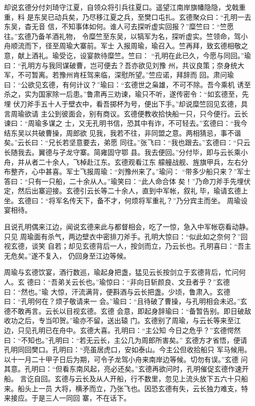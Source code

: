 却说玄德分付刘琦守江夏，自领众将引兵往夏口。遥望江南岸旗幡隐隐，戈戟重重，料
是东吴已动兵矣，乃尽移江夏之兵，至樊口屯扎。玄德聚众曰：“孔明一去东吴，杳无音
信，不知事体如何。谁人可去探听虚实回报？”糜竺曰：“竺愿往。”玄德乃备羊酒礼物，
令糜竺至东吴，以犒军为名，探听虚实。竺领命，驾小舟顺流而下，径至周瑜大寨前。军士
入报周瑜，瑜召入。竺再拜，致玄德相敬之意，献上酒礼。瑜受讫，设宴款待糜竺。竺曰：
“孔明在此已久，今愿与同回。”瑜曰：“孔明方与我同谋破曹，岂可便去？吾亦欲见刘豫
州，共议良策；奈身统大军，不可暂离。若豫州肯枉驾来临，深慰所望。”竺应诺，拜辞而
回。肃问瑜曰：“公欲见玄德，有何计议？”瑜曰：“玄德世之枭雄，不可不除。吾今乘机
诱至杀之，实为国家除一后患。”鲁肃再三劝谏，瑜只不听，遂传密令：“如玄德至，先埋
伏刀斧手五十人于壁衣中，看吾掷杯为号，便出下手。”却说糜竺回见玄德，具言周瑜欲请
主公到彼面会，别有商议。玄德便教收拾快船一只，只今便行。云长谏曰：“周瑜多谋之
士，又无孔明书信，恐其中有诈，不可轻去。”玄德曰：“我今结东吴以共破曹操，周郎欲
见我，我若不往，非同盟之意。两相猜忌，事不谐矣。”云长曰：“兄长若坚意要去，弟愿
同往。”张飞曰：“我也跟去。”玄德曰：“只云长随我去。翼德与子龙守寨。简雍固守鄂
县。我去便回。”分付毕，即与云长乘小舟，并从者二十余人，飞棹赴江东。玄德观看江东
艨艟战舰、旌旗甲兵，左右分布整齐，心中甚喜。军士飞报周瑜：“刘豫州来了。”瑜问：
“带多少船只来？”军士答曰：“只有一只船，二十余从人。”瑜笑曰：“此人命合体
矣！”乃命刀斧手先埋伏定，然后出寨迎接。玄德引云长等二十余人，直到中军帐，叙礼
毕，瑜请玄德上坐。玄德曰：“将军名传天下，备不才，何烦将军重礼？”乃分宾主而坐。
周瑜设宴相待。

且说孔明偶来江边，闻说玄德来此与都督相会，吃了一惊，急入中军帐窃看动静。只见
周瑜面有杀气，两边壁衣中密排刀斧手。孔明大惊曰：“似此如之奈何？”回视玄德，谈笑
自若；却见玄德背后一人，按剑而立，乃云长也。孔明喜曰：“吾主无危矣。”遂不复入，
仍回身至江边等候。

周瑜与玄德饮宴，酒行数巡，瑜起身把盏，猛见云长按剑立于玄德背后，忙问何人。玄
德曰：“吾弟关云长也。”瑜惊曰：“非向日斩颜良、文丑者乎？”玄德曰：“然也。”瑜
大惊，汗流满背，便斟酒与云长把盏。少顷，鲁肃入。玄德曰：“孔明何在？烦子敬请来一
会。”瑜曰：“且待破了曹操，与孔明相会未迟。”玄德不敢再言。云长以目视玄德。玄德
会意，即起身辞瑜曰：“备暂告别。即日破敌收功之后，专当叩贺。”瑜亦不留，送出辕
门。玄德别了周瑜，与云长等来至江边，只见孔明已在舟中。玄德大喜。孔明曰：“主公知
今日之危乎？”玄德愕然曰：“不知也。”孔明曰：“若无云长，主公几为周郎所害矣。”
玄德方才省悟，便请孔明同回樊口。孔明曰：“亮虽居虎口，安如泰山。今主公但收拾船只
军马候用。以十一月二十甲子日后为期，可令子龙驾小舟来南岸边等候。切勿有误。”玄德
问其意。孔明曰：“但看东南风起，亮必还矣。”玄德再欲问时，孔明催促玄德作速开船。
言讫自回。玄德与云长及从人开船，行不数里，忽见上流头放下五六十只船来。船头上一员
大将，横矛而立，乃张飞也。因恐玄德有失，云长独力难支，特来接应。于是三人一同回
寨，不在话下。

